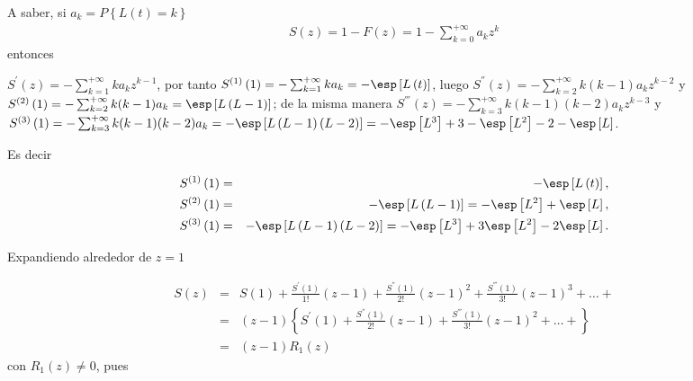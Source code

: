 A saber, si $a_{k}=P\left\{L\left(t\right)=k\right\}$
\begin{eqnarray*}
S\left(z\right)=1-F\left(z\right)=1-\sum_{k=0}^{+\infty}a_{k}z^{k}
\end{eqnarray*}
entonces


$S^{'}\left(z\right)=-\sum_{k=1}^{+\infty}ka_{k}z^{k-1}$, por tanto $S^{(1)}\left(1\right)=-\sum_{k=1}^{+\infty}ka_{k}=-\esp\left[L\left(t\right)\right]$,
luego $S^{''}\left(z\right)=-\sum_{k=2}^{+\infty}k(k-1)a_{k}z^{k-2}$ y $S^{(2)}\left(1\right)=-\sum_{k=2}^{+\infty}k(k-1)a_{k}=\esp\left[L\left(L-1\right)\right]$;
de la misma manera $S^{'''}\left(z\right)=-\sum_{k=3}^{+\infty}k(k-1)(k-2)a_{k}z^{k-3}$ y $S^{(3)}\left(1\right)=-\sum_{k=3}^{+\infty}k(k-1)(k-2)a_{k}=-\esp\left[L\left(L-1\right)\left(L-2\right)\right]
=-\esp\left[L^{3}\right]+3-\esp\left[L^{2}\right]-2-\esp\left[L\right]$. 

Es decir

\begin{eqnarray*}
S^{(1)}\left(1\right)&=&-\esp\left[L\left(t\right)\right],\\ S^{(2)}\left(1\right)&=&-\esp\left[L\left(L-1\right)\right]
=-\esp\left[L^{2}\right]+\esp\left[L\right],\\
S^{(3)}\left(1\right)&=&-\esp\left[L\left(L-1\right)\left(L-2\right)\right]
=-\esp\left[L^{3}\right]+3\esp\left[L^{2}\right]-2\esp\left[L\right].
\end{eqnarray*}


Expandiendo alrededor de $z=1$

\begin{eqnarray*}
S\left(z\right)&=&S\left(1\right)+\frac{S^{'}\left(1\right)}{1!}\left(z-1\right)+\frac{S^{''}\left(1\right)}{2!}\left(z-1\right)^{2}+\frac{S^{'''}\left(1\right)}{3!}\left(z-1\right)^{3}+\ldots+\\
&=&\left(z-1\right)\left\{S^{'}\left(1\right)+\frac{S^{''}\left(1\right)}{2!}\left(z-1\right)+\frac{S^{'''}\left(1\right)}{3!}\left(z-1\right)^{2}+\ldots+\right\}\\
&=&\left(z-1\right)R_{1}\left(z\right)
\end{eqnarray*}
con $R_{1}\left(z\right)\neq0$, pues

